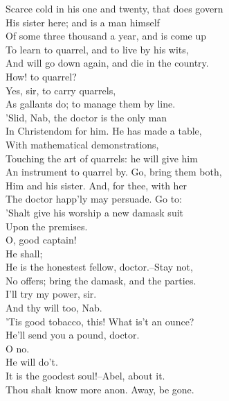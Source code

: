 \documentclass{memoir}
\begin{document}
\begin{drama*}
 Scarce cold in his one and twenty, that does govern\\
 His sister here; and is a man himself\\
 Of some three thousand a year, and is come up\\
 To learn to quarrel, and to live by his wits,\\
 And will go down again, and die in the country.\\
\facespeaks  How! to quarrel?\\
\druggerspeaks {} Yes, sir, to carry quarrels,\\
 As gallants do; to manage them by line.\\
\facespeaks  'Slid, Nab, the doctor is the only man\\
 In Christendom for him. He has made a table,\\
 With mathematical demonstrations,\\
 Touching the art of quarrels: he will give him\\
 An instrument to quarrel by. Go, bring them both,\\
 Him and his sister. And, for thee, with her\\
 The doctor happ'ly may persuade. Go to:\\
 'Shalt give his worship a new damask suit\\
 Upon the premises.\\
\subtlespeaks {} O, good captain!\\
\facespeaks  He shall;\\
 He is the honestest fellow, doctor.--Stay not,\\
 No offers; bring the damask, and the parties.\\
\druggerspeaks  I'll try my power, sir.\\
\facespeaks {} And thy will too, Nab.\\
\subtlespeaks  'Tis good tobacco, this! What is't an ounce?\\
\facespeaks  He'll send you a pound, doctor.\\
\subtlespeaks {} O no.\\
\facespeaks {} He will do't.\\
 It is the goodest soul!--Abel, about it.\\
 Thou shalt know more anon. Away, be gone.\\

\end{drama*}
\end{document}
